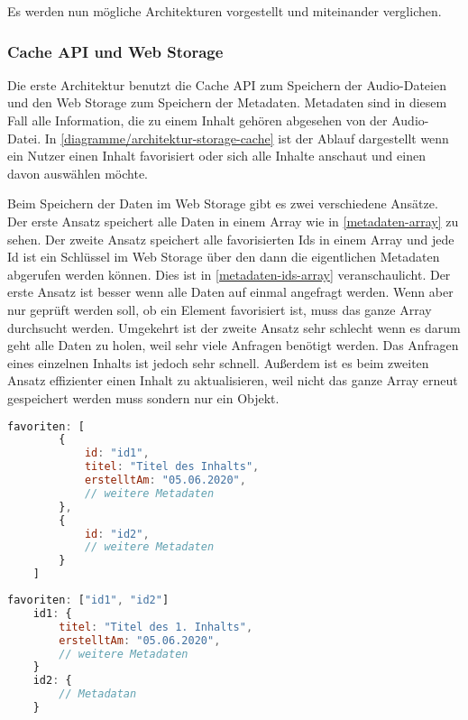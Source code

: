 Es werden nun mögliche Architekturen vorgestellt und miteinander verglichen. 

\subsubsection{Cache API und Web Storage}
Die erste Architektur benutzt die Cache \ac{API} zum Speichern der Audio-Dateien und den Web Storage zum Speichern der Metadaten. Metadaten sind in diesem Fall alle Information, die zu einem Inhalt gehören abgesehen von der Audio-Datei. In \autoref{diagramme/architektur-storage-cache} ist der Ablauf dargestellt wenn ein Nutzer einen Inhalt favorisiert oder sich alle Inhalte anschaut und einen davon auswählen möchte. 


\clearpage

Beim Speichern der Daten im Web Storage gibt es zwei verschiedene Ansätze. Der erste Ansatz speichert alle Daten in einem Array wie in \autoref{metadaten-array} zu sehen. Der zweite Ansatz speichert alle favorisierten Ids in einem Array und jede Id ist ein Schlüssel im Web Storage über den dann die eigentlichen Metadaten abgerufen werden können. Dies ist in \autoref{metadaten-ids-array} veranschaulicht.
Der erste Ansatz ist besser wenn alle Daten auf einmal angefragt werden. Wenn aber nur geprüft werden soll, ob ein Element favorisiert ist, muss das ganze Array durchsucht werden. Umgekehrt ist der zweite Ansatz sehr schlecht wenn es darum geht alle Daten zu holen, weil sehr viele Anfragen benötigt werden. Das Anfragen eines einzelnen Inhalts ist jedoch sehr schnell. Außerdem ist es beim zweiten Ansatz effizienter einen Inhalt zu aktualisieren, weil nicht das ganze Array erneut gespeichert werden muss sondern nur ein Objekt.

\begin{lstlisting}[language=JavaScript,caption={Speichern der Metadaten in einem Array},label={metadaten-array}]
    favoriten: [
    	{
    		id: "id1",
    		titel: "Titel des Inhalts",
    		erstelltAm: "05.06.2020",
    		// weitere Metadaten
    	},
    	{
    		id: "id2",
    		// weitere Metadaten
    	}
    ]
\end{lstlisting}

\begin{lstlisting}[language=JavaScript,caption={Speichern der Ids in einem Array},label={metadaten-ids-array}]
    favoriten: ["id1", "id2"]
    id1: {
    	titel: "Titel des 1. Inhalts",
    	erstelltAm: "05.06.2020",
    	// weitere Metadaten
    }
    id2: { 
    	// Metadatan
    }
\end{lstlisting}

